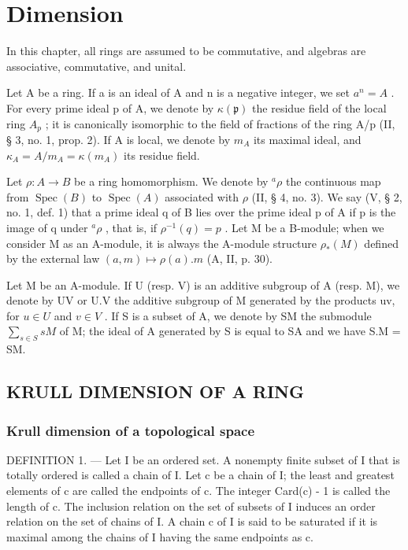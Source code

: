 \chapter{Dimension}

In this chapter, all rings are assumed to be commutative, and algebras are associative, commutative, and unital.

Let A be a ring. If a is an ideal of A and n is a negative integer, we set \(a^{n} = A\) . For every prime ideal p of A, we denote by \(\kappa(\mathfrak{p})\) the residue field of the local ring \(A_{p}\) ; it is canonically isomorphic to the field of fractions of the ring A/p (II, § 3, no. 1, prop. 2). If A is local, we denote by \(m_{A}\) its maximal ideal, and \(\kappa_{A} = A/m_{A} = \kappa(m_{A})\) its residue field.

Let \(\rho: A \to B\) be a ring homomorphism. We denote by \(^a\rho\) the continuous map from \(\operatorname{Spec}(B)\) to \(\operatorname{Spec}(A)\) associated with \(\rho\) (II, § 4, no. 3). We say (V, § 2, no. 1, def. 1) that a prime ideal q of B lies over the prime ideal p of A if p is the image of q under \(^a\rho\) , that is, if \(\rho^{-1}(q) = p\) . Let M be a B-module; when we consider M as an A-module, it is always the A-module structure \(\rho_*(M)\) defined by the external law \((a, m) \mapsto \rho(a).m\) (A, II, p. 30).

Let M be an A-module. If U (resp. V) is an additive subgroup of A (resp. M), we denote by UV or U.V the additive subgroup of M generated by the products uv, for \(u \in U\) and \(v \in V\) . If S is a subset of A, we denote by SM the submodule \(\sum_{s \in S} sM\) of M; the ideal of A generated by S is equal to SA and we have S.M = SM.

\section{KRULL DIMENSION OF A RING}

\subsection{Krull dimension of a topological space}

DEFINITION 1. --- Let I be an ordered set. A nonempty finite subset of I that is totally ordered is called a chain of I. Let c be a chain of I; the least and greatest elements of c are called the endpoints of c. The integer Card(c) - 1 is called the length of c. The inclusion relation on the set of subsets of I induces an order relation on the set of chains of I. A chain c of I is said to be saturated if it is maximal among the chains of I having the same endpoints as c.


